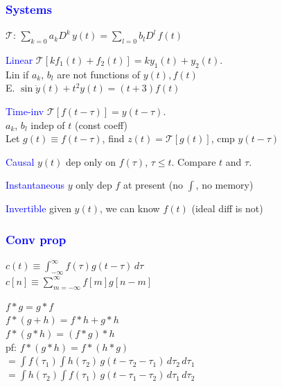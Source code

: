 \documentclass[4pt]{article}
\theoremstyle{definition}
\theoremstyle{definition}
\newcommand{\blue}[1]{\textcolor{blue}{#1}}
\begin{document}
\begin{landscape}
\begin{multicols}{3}
\subsubsection*{\blue{Systems}}
    $\mathcal{T}$: $\sum_{k=0}a_k D^k \, y(t) = \sum_{l=0}b_lD^l\, f(t)$

    \blue{Linear} $\mathcal{T}[kf_1(t) + f_2(t)] = ky_1(t) + y_2(t)$.\\
        \hspace{1em} Lin if $a_k$, $b_l$ are not functions of $y(t), f(t)$\\
            \hspace{2em} E. $\sin\dot{y}(t) + t^2 y(t) = (t+3) f(t)$
    
    \blue{Time-inv} $\mathcal{T}[f(t-\tau)] = y(t-\tau)$.\\
        \hspace{1em} $a_k$, $b_l$ indep of $t$ (const coeff)\\
        \hspace{1em} Let $g(t)\equiv f(t-\tau)$, find $z(t) = \mathcal{T}[g(t)]$, cmp $y(t-\tau)$


    \blue{Causal} $y(t)$ dep only on $f(\tau)$, $\tau \leq t$. 
    Compare $t$ and $\tau$.
    
    \blue{Instantaneous} $y$ only dep $f$ at present (no $\int$, no memory)
    
    \blue{Invertible} given $y(t)$, we can know $f(t)$ (ideal diff is not)
\subsubsection*{\blue{Conv prop}}
    $c(t) \equiv \int_{-\infty}^{\infty} f(\tau) g(t-\tau) \, d\tau$\\
    \(c[n] \equiv \sum_{m = -\infty}^{\infty} f[m] g[n-m]\)          %


    $f * g = g * f$\\
    $f * (g + h) = f * h + g * h$\\
    $f * (g * h) = (f * g) * h$\\
        \hspace{1em} pf: $f * (g * h) = f * (h * g)$\\
            \hspace{2em} \(= \int f(\tau_1) \int h(\tau_2)\, g(t - \tau_2 - \tau_1) \, d\tau_2 \, d\tau_1\)\\
            \hspace{2em} \(= \int h(\tau_2) \int f(\tau_1)\, g(t - \tau_1 - \tau_2) \, d\tau_1 \, d\tau_2\)
    

\end{multicols}
\end{landscape}
\end{document}
